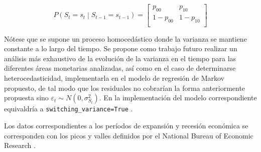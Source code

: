 \documentclass[titlepage, 12pt]{article}
\begin{document}
\begin{equation}
    P\left(S_t=s_t\middle| S_{t-1}=s_{t-1}\right)=
    \begin{bmatrix}
        p_{00}   & p_{10}   \\
        1-p_{00} & 1-p_{10} \\
    \end{bmatrix}
\end{equation}


Nótese que se supone un proceso homocedástico donde la varianza se mantiene constante a lo largo del tiempo. Se propone como trabajo futuro realizar un análisis más exhaustivo de la evolución de la varianza en el tiempo para las diferentes áreas monetarias analizadas, así como en el caso de determinarse heterocedasticidad, implementarla en el modelo de regresión de Markov propuesto, de tal modo que los residuales no cobrarían la forma anteriormente propuesta sino $\varepsilon_t\sim N\left(0,\sigma_{S_t}^2\right)$. En la implementación del modelo correspondiente equivaldría a \texttt{switching\_variance=True} \autocite{statsmodels2024c}.

Los datos correspondientes a los períodos de expansión y recesión económica se corresponden con los picos y valles definidos por el National Bureau of Economic Research \autocite{nber2023}.
\end{document}

